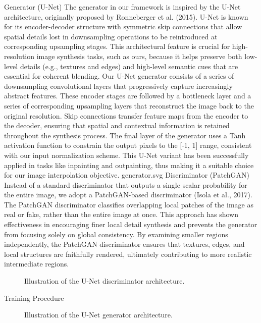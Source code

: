 \documentclass[sigconf]{acmart}
\begin{document}
Generator (U-Net)
The generator in our framework is inspired by the U-Net architecture, originally proposed by Ronneberger et al. (2015). U-Net is known for its encoder-decoder structure with symmetric skip connections that allow spatial details lost in downsampling operations to be reintroduced at corresponding upsampling stages. This architectural feature is crucial for high-resolution image synthesis tasks, such as ours, because it helps preserve both low-level details (e.g., textures and edges) and high-level semantic cues that are essential for coherent blending.
Our U-Net generator consists of a series of downsampling convolutional layers that progressively capture increasingly abstract features. These encoder stages are followed by a bottleneck layer and a series of corresponding upsampling layers that reconstruct the image back to the original resolution. Skip connections transfer feature maps from the encoder to the decoder, ensuring that spatial and contextual information is retained throughout the synthesis process. The final layer of the generator uses a Tanh activation function to constrain the output pixels to the [-1, 1] range, consistent with our input normalization scheme. This U-Net variant has been successfully applied in tasks like inpainting and outpainting, thus making it a suitable choice for our image interpolation objective.
generator.svg
Discriminator (PatchGAN)
Instead of a standard discriminator that outputs a single scalar probability for the entire image, we adopt a PatchGAN-based discriminator (Isola et al., 2017). The PatchGAN discriminator classifies overlapping local patches of the image as real or fake, rather than the entire image at once. This approach has shown effectiveness in encouraging finer local detail synthesis and prevents the generator from focusing solely on global consistency. By examining smaller regions independently, the PatchGAN discriminator ensures that textures, edges, and local structures are faithfully rendered, ultimately contributing to more realistic intermediate regions.
\begin{figure}[h!]
    \centering
    
    \caption{Illustration of the U-Net discriminator architecture.}
    \label{fig:discriminator}
\end{figure}


Training Procedure
\begin{figure}[h!]
    \centering
    
    \caption{Illustration of the U-Net generator architecture.}
    \label{fig:generator}
\end{figure}
\end{document}
